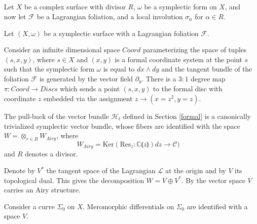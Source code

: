     \newpage 
    
    \subsection{}


    Let \(X\) be a complex surface with divisor \(R\), \(\omega\) be a symplectic form on \(X\), and now let \(\mathcal{F}\) be a Lagrangian foliation, and a local involution \( \sigma_{\alpha}\) for \( \alpha \in R\).
    
    Let  $(X,\omega)$ be a symplectic surface with a Lagrangian foliation $\mathcal{F}$. 
    
    Consider an infinite dimensional space $Coord$ parameterizing the space of tuples $(s,x,y)$, where $s \in X$ and $(x,y)$ is a formal coordinate system at the point $s$ such that the symplectic form $\omega$ is equal to $dx \wedge dy$ and the tangent bundle of the foliation $\mathcal{F}$ is generated by the vector field $\partial_y$. 
    There is a $3:1$ degree map $\pi:Coord \rightarrow Discs$ which sends a point $(s,x,y)$ to the formal disc with coordinate $z$ embedded via the assignment $z \rightarrow (x=z^2,y=z)$. 
    
    The pull-back of the vector bundle $\mathcal{H}_t$ defined in Section \ref{formal} is a canonically trivialized symplectic vector bundle, whose fibers are identified with the space $W = \otimes_{r \in R} W_{Airy} $, where
    $$W_{Airy}=\mathrm{Ker}(\mathrm{Res}_z: \mathbb{C} \lParen z \rParen) dz \rightarrow \mathcal{C})$$
    and $R$ denotes a divisor.
    
    
    Denote by $V^*$ the tangent space of the Lagrangian $\mathcal{L}$ at the origin and by $V$ its topological dual. This gives the decomposition $W=V \oplus V^*$.
    By \cite[Corollary 7.2.1]{KSoAir} the vector space $V$ carries an Airy structure. 
    
    
    
    
    Consider a curve \( \Sigma_0\) on \(X\). Meromorphic differentials on \( \Sigma_0 \) are identified with a space \(V\).
    
